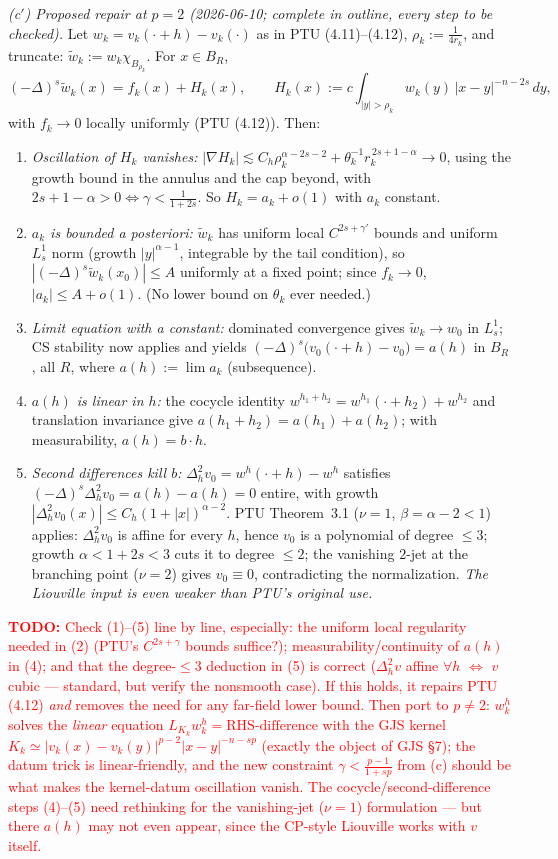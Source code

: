 \documentclass[11pt]{amsart}
\theoremstyle{plain}
\theoremstyle{definition}
\theoremstyle{remark}
\newcommand{\al}{\alpha}
\newcommand{\TODO}[1]{\textcolor{red}{\textbf{TODO:} #1}}
\begin{document}
\emph{(c$'$) Proposed repair at $p=2$ (2026-06-10; complete in outline,
every step to be checked).} Let $w_k=v_k(\cdot+h)-v_k(\cdot)$ as in PTU
(4.11)--(4.12), $\rho_k:=\frac{1}{4r_k}$, and truncate:
$\tilde w_k:=w_k\chi_{B_{\rho_k}}$. For $x\in B_R$,
\[
  (-\Delta)^s\tilde w_k(x) = f_k(x) + H_k(x),
  \qquad
  H_k(x):=c\int_{|y|>\rho_k} w_k(y)\,|x-y|^{-n-2s}\,dy,
\]
with $f_k\to0$ locally uniformly (PTU (4.12)). Then:
\begin{enumerate}
\item \emph{Oscillation of $H_k$ vanishes:} $|\nabla H_k|\lesssim
  C_h\rho_k^{\al-2s-2} + \theta_k^{-1}r_k^{\,2s+1-\al}\to0$, using the
  growth bound in the annulus and the cap beyond, with
  $2s+1-\al>0\iff\gamma<\frac{1}{1+2s}$. So $H_k=a_k+o(1)$ with $a_k$
  constant.
\item \emph{$a_k$ is bounded a posteriori:} $\tilde w_k$ has uniform
  local $C^{2s+\gamma'}$ bounds and uniform $L^1_s$ norm (growth
  $|y|^{\al-1}$, integrable by the tail condition), so
  $|(-\Delta)^s\tilde w_k(x_0)|\le A$ uniformly at a fixed point; since
  $f_k\to0$, $|a_k|\le A+o(1)$. (No lower bound on $\theta_k$ ever
  needed.)
\item \emph{Limit equation with a constant:} dominated convergence gives
  $\tilde w_k\to w_0$ in $L^1_s$; CS stability now applies and yields
  $(-\Delta)^s\big(v_0(\cdot+h)-v_0\big)=a(h)$ in $B_R$, all $R$, where
  $a(h):=\lim a_k$ (subsequence).
\item \emph{$a(h)$ is linear in $h$:} the cocycle identity
  $w^{h_1+h_2}=w^{h_1}(\cdot+h_2)+w^{h_2}$ and translation invariance
  give $a(h_1+h_2)=a(h_1)+a(h_2)$; with measurability, $a(h)=b\cdot h$.
\item \emph{Second differences kill $b$:}
  $\Delta_h^2v_0 = w^{h}(\cdot+h)-w^{h}$ satisfies
  $(-\Delta)^s\Delta^2_hv_0 = a(h)-a(h)=0$ entire, with growth
  $|\Delta^2_hv_0(x)|\le C_h(1+|x|)^{\al-2}$. PTU Theorem~3.1
  ($\nu=1$, $\beta=\al-2<1$) applies: $\Delta^2_hv_0$ is affine for
  every $h$, hence $v_0$ is a polynomial of degree $\le3$; growth
  $\al<1+2s<3$ cuts it to degree $\le2$; the vanishing $2$-jet at the
  branching point ($\nu=2$) gives $v_0\equiv0$, contradicting the
  normalization. \emph{The Liouville input is even weaker than PTU's
  original use.}
\end{enumerate}
\TODO{Check (1)--(5) line by line, especially: the uniform local
regularity needed in (2) (PTU's $C^{2s+\gamma}$ bounds suffice?);
measurability/continuity of $a(h)$ in (4); and that the degree-$\le3$
deduction in (5) is correct ($\Delta^2_h v$ affine $\forall h$ $\iff$
$v$ cubic --- standard, but verify the nonsmooth case). If this holds,
it repairs PTU (4.12) \emph{and} removes the need for any far-field
lower bound. Then port to $p\neq2$: $w_k^h$ solves the \emph{linear}
equation $L_{K_k}w_k^h=\text{RHS-difference}$ with the GJS kernel
$K_k\simeq|v_k(x)-v_k(y)|^{p-2}|x-y|^{-n-sp}$ (exactly the object of
GJS \S7); the datum trick is linear-friendly, and the new constraint
$\gamma<\frac{p-1}{1+sp}$ from (c) should be what makes the kernel-datum
oscillation vanish. The cocycle/second-difference steps (4)--(5) need
rethinking for the vanishing-jet ($\nu=1$) formulation --- but there
$a(h)$ may not even appear, since the CP-style Liouville works with
$v$ itself.}
\end{document}
